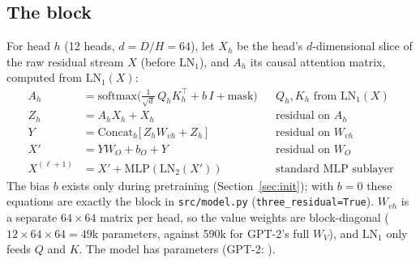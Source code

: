 \documentclass[11pt]{article}
\newcommand{\code}[1]{\texttt{#1}}
\newcommand{\cat}{\mathrm{Concat}_h}
\begin{document}
\subsection{The block}
For head $h$ (12 heads, $d = D/H = 64$), let $X_h$ be the head's $d$-dimensional slice of the raw residual stream
$X$ (before $\mathrm{LN}_1$), and $A_h$ its causal attention matrix, computed from $\mathrm{LN}_1(X)$:
\begin{align}
A_h &= \mathrm{softmax}\!\Big(\tfrac{1}{\sqrt d}\,Q_hK_h^\top + b\,I + \text{mask}\Big)
  && Q_h, K_h \text{ from } \mathrm{LN}_1(X) \\
Z_h &= A_h X_h + X_h && \text{residual on } A_h \label{eq:z}\\
Y &= \cat\big[\,Z_h W_{vh} + Z_h\,\big] && \text{residual on } W_{vh} \\
X' &= Y W_O + b_O + Y && \text{residual on } W_O \\
X^{(\ell+1)} &= X' + \mathrm{MLP}(\mathrm{LN}_2(X')) && \text{standard MLP sublayer}
\end{align}
The bias $b$ exists only during pretraining (Section~\ref{sec:init}); with $b=0$ these equations are exactly the
block in \code{src/model.py} (\code{three\_residual=True}). $W_{vh}$ is a separate $64\times64$ matrix per head,
so the value weights are block-diagonal ($12\times64\times64 = 49$k parameters, against 590k for GPT-2's full
$W_V$), and $\mathrm{LN}_1$ only feeds $Q$ and $K$. The model has \ParamsThree{} parameters
(GPT-2: \ParamsBase{}).
\end{document}
